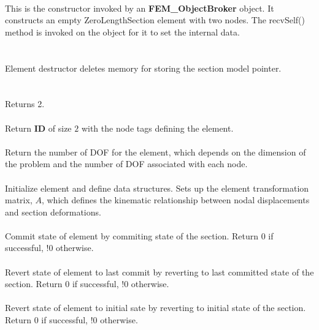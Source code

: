  \\ 
This is the constructor invoked by an {\bf FEM\_ObjectBroker} object. It
constructs an empty ZeroLengthSection element with two nodes.
The recvSelf() method is
invoked on the object for it to set the internal data. 
\\

 \\
 \\ 
Element destructor deletes memory for storing the section model pointer. 
\\

  \\
 \\
Returns 2.
\\

 \\
Return {\bf ID} of size $2$ with the node tags defining the element.
\\

 \\	
Return the number of DOF for the element, which depends on the dimension of the problem
and the number of DOF associated with each node.
\\

 \\
Initialize element and define data structures.  Sets up the element
transformation matrix, $A$, which defines the kinematic relationship between
nodal displacements and section deformations.
\\

 \\
Commit state of element by commiting state of the section.
Return 0 if successful, !0 otherwise.
\\

 \\        
Revert state of element to last commit by reverting to last committed state of the section.
Return 0 if successful, !0 otherwise.
\\

 \\        
Revert state of element to initial sate by reverting to initial state of the section.
Return 0 if successful, !0 otherwise.
\\

